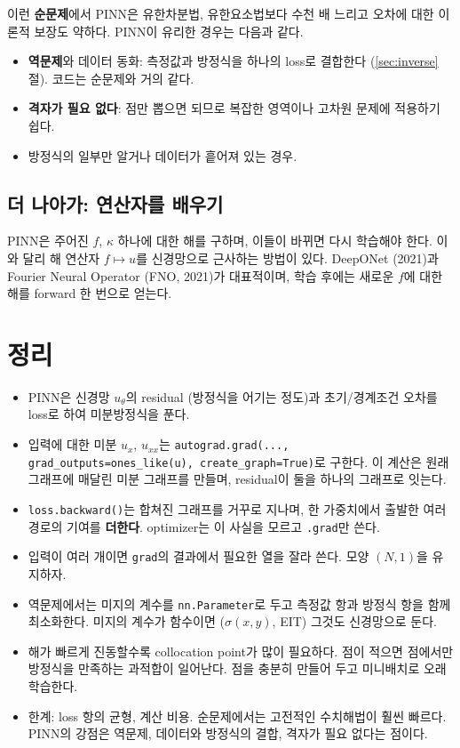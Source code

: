 \documentclass[11pt,a4paper]{article}
\begin{document}
이런 \textbf{순문제}에서 PINN은 유한차분법, 유한요소법보다 수천 배 느리고 오차에 대한 이론적 보장도 약하다. PINN이 유리한 경우는 다음과 같다.
\begin{itemize}[leftmargin=1.5em]
\item \textbf{역문제}와 데이터 동화: 측정값과 방정식을 하나의 loss로 결합한다 (\ref{sec:inverse}절). 코드는 순문제와 거의 같다.
\item \textbf{격자가 필요 없다}: 점만 뽑으면 되므로 복잡한 영역이나 고차원 문제에 적용하기 쉽다.
\item 방정식의 일부만 알거나 데이터가 흩어져 있는 경우.
\end{itemize}

\subsection{더 나아가: 연산자를 배우기}

PINN은 주어진 $f$, $\kappa$ 하나에 대한 해를 구하며, 이들이 바뀌면 다시 학습해야 한다.
이와 달리 해 연산자 $f\mapsto u$를 신경망으로 근사하는 방법이 있다. DeepONet (2021)과 Fourier Neural Operator (FNO, 2021)가 대표적이며,
학습 후에는 새로운 $f$에 대한 해를 forward 한 번으로 얻는다.

\section{정리}\label{sec:summary}

\begin{keybox}[PINN: 정리]
\begin{itemize}[leftmargin=1.5em]
\item PINN은 신경망 $u_\theta$의 residual (방정식을 어기는 정도)과 초기/경계조건 오차를 loss로 하여 미분방정식을 푼다.
\item 입력에 대한 미분 $u_x$, $u_{xx}$는 \texttt{autograd.grad(..., grad\_outputs=ones\_like(u), create\_graph=True)}로 구한다.
이 계산은 원래 그래프에 매달린 미분 그래프를 만들며, residual이 둘을 하나의 그래프로 잇는다.
\item \texttt{loss.backward()}는 합쳐진 그래프를 거꾸로 지나며, 한 가중치에서 출발한 여러 경로의 기여를 \textbf{더한다}.
optimizer는 이 사실을 모르고 \texttt{.grad}만 쓴다.
\item 입력이 여러 개이면 \texttt{grad}의 결과에서 필요한 열을 잘라 쓴다. 모양 $(N,1)$을 유지하자.
\item 역문제에서는 미지의 계수를 \texttt{nn.Parameter}로 두고 측정값 항과 방정식 항을 함께 최소화한다.
미지의 계수가 함수이면 ($\sigma(x,y)$, EIT) 그것도 신경망으로 둔다.
\item 해가 빠르게 진동할수록 collocation point가 많이 필요하다. 점이 적으면 점에서만 방정식을 만족하는 과적합이 일어난다. 점을 충분히 만들어 두고 미니배치로 오래 학습한다.
\item 한계: loss 항의 균형, 계산 비용. 순문제에서는 고전적인 수치해법이 훨씬 빠르다.
PINN의 강점은 역문제, 데이터와 방정식의 결합, 격자가 필요 없다는 점이다.
\end{itemize}
\end{keybox}
\end{document}
